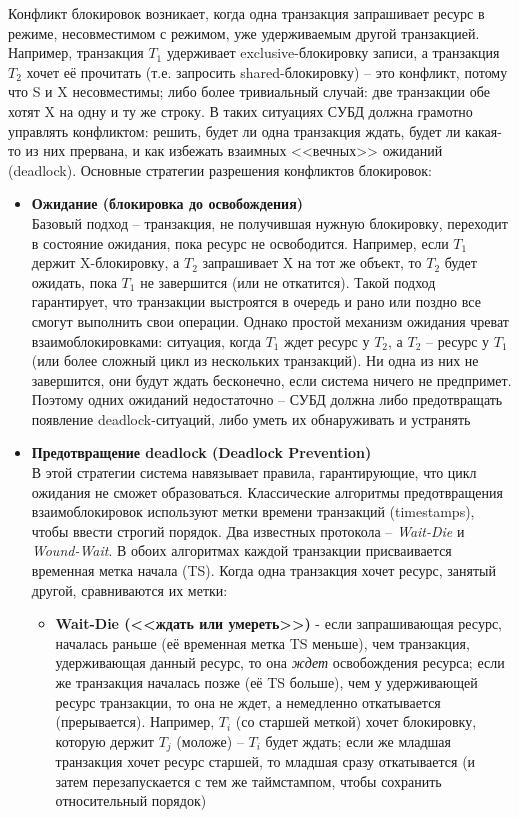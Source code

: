  Конфликт блокировок возникает, когда одна транзакция запрашивает ресурс в режиме, несовместимом с режимом, уже удерживаемым другой транзакцией. Например, транзакция $T_1$ удерживает exclusive-блокировку записи, а транзакция $T_2$ хочет её прочитать (т.е. запросить shared-блокировку) – это конфликт, потому что S и X несовместимы; либо более тривиальный случай: две транзакции обе хотят X на одну и ту же строку. В таких ситуациях СУБД должна грамотно управлять конфликтом: решить, будет ли одна транзакция ждать, будет ли какая-то из них прервана, и как избежать взаимных <<вечных>> ожиданий (deadlock). Основные стратегии разрешения конфликтов блокировок:
 \begin{itemize}
    \item \textbf{Ожидание (блокировка до освобождения)} ~\\
   Базовый подход – транзакция, не получившая нужную блокировку, переходит в состояние ожидания, пока ресурс не освободится. Например, если $T_1$ держит X-блокировку, а $T_2$ запрашивает X на тот же объект, то $T_2$ будет ожидать, пока $T_1$ не завершится (или не откатится). Такой подход гарантирует, что транзакции выстроятся в очередь и рано или поздно все смогут выполнить свои операции. Однако простой механизм ожидания чреват взаимоблокировками: ситуация, когда $T_1$ ждет ресурс у $T_2$, а $T_2$ – ресурс у $T_1$ (или более сложный цикл из нескольких транзакций). Ни одна из них не завершится, они будут ждать бесконечно, если система ничего не предпримет. Поэтому одних ожиданий недостаточно – СУБД должна либо предотвращать появление deadlock-ситуаций, либо уметь их обнаруживать и устранять 
    \item \textbf{Предотвращение deadlock (Deadlock Prevention)} ~\\
    В этой стратегии система навязывает правила, гарантирующие, что цикл ожидания не сможет образоваться. Классические алгоритмы предотвращения взаимоблокировок используют метки времени транзакций (timestamps), чтобы ввести строгий порядок. Два известных протокола – \textit{Wait-Die} и \textit{Wound-Wait}. В обоих алгоритмах каждой транзакции присваивается временная метка начала (TS). Когда одна транзакция хочет ресурс, занятый другой, сравниваются их метки: 
    \begin{itemize}
        \item \textbf{Wait-Die (<<ждать или умереть>>)} - если запрашивающая ресурс, началась раньше (её временная метка TS меньше), чем транзакция, удерживающая данный ресурс, то она \textit{ждет} освобождения ресурса; если же транзакция началась позже (её TS больше), чем у удерживающей ресурс транзакции, то она не ждет, а немедленно откатывается (прерывается). Например, $T_i$ (со старшей меткой) хочет блокировку, которую держит $T_j$ (моложе) – $T_i$ будет ждать; если же младшая транзакция хочет ресурс старшей, то младшая сразу откатывается (и затем перезапускается с тем же таймстампом, чтобы сохранить относительный порядок)

\end{itemize}
\end{itemize}
